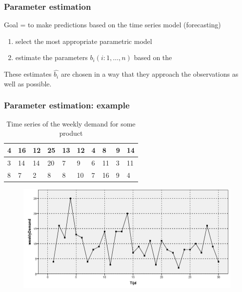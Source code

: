 \documentclass{beamer}
\begin{document}
\begin{frame}
  \frametitle{Parameter estimation}

  Goal = to make predictions based on the time series model (forecasting)

  \begin{enumerate}
    \item select the most appropriate parametric model
    \item estimate the parameters $b_i (i: 1, \dots, n)$ based on the
  \end{enumerate}

  These estimates $\widehat{b_i}$ are chosen in a way that they approach the observations as well as possible.
\end{frame}

\begin{frame}
  \frametitle{Parameter estimation: example}

  \begin{table}[t]
    \centering
    \begin{tabular}{|l|l|l|l|l|l|l|l|l|l|}
      \hline
      4 & 16 & 12 & 25 & 13 & 12 & 4 & 8  & 9 & 14 \\ \hline
      3 & 14 & 14 & 20 & 7  & 9  & 6 & 11 & 3 & 11 \\ \hline
      8 & 7  & 2  & 8  & 8  & 10 & 7 & 16 & 9 & 4  \\ \hline
    \end{tabular}
    \label{tab:data}
    \caption{Time series of the weekly demand for some product}
  \end{table}

  \begin{figure}
    \centering
    \includegraphics[width=.7\textwidth]{img/tijdreeks11}
  \end{figure}
\end{frame}
\end{document}
